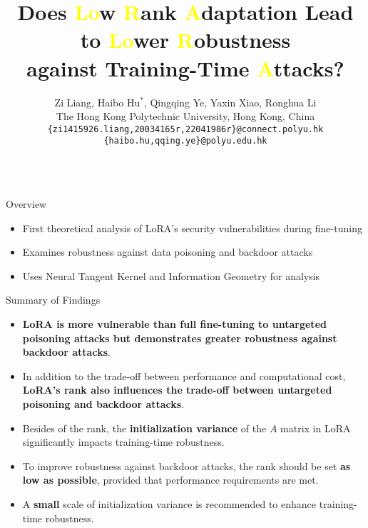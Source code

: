 \documentclass[final,hyperref={pdfpagelabels=false}]{beamer}
\title{Does \textcolor{yellow}{Lo}w \textcolor{yellow}{R}ank \textcolor{yellow}{A}daptation Lead to \textcolor{yellow}{Lo}wer \textcolor{yellow}{R}obustness\\
  against Training-Time \textcolor{yellow}{A}ttacks?}
\author{
  Zi Liang, Haibo Hu$^{*}$, Qingqing Ye,
  Yaxin Xiao, Ronghua Li
\\
  The Hong Kong Polytechnic University, Hong Kong, China\\
  \texttt{\{zi1415926.liang,20034165r,22041986r\}@connect.polyu.hk}\\
  \texttt{\{haibo.hu,qqing.ye\}@polyu.edu.hk}\\
}
\newcommand{\shrink}{-15pt}
\begin{document}

\begin{frame}[t] %

\begin{columns}[t] %



  \begin{column}{.34\textwidth} %

    \begin{block}{Overview}
      \begin{itemize}
      \item First theoretical analysis of LoRA's security vulnerabilities during fine-tuning
      \item Examines robustness against data poisoning and backdoor attacks
      \item Uses Neural Tangent Kernel and Information Geometry for analysis
      \end{itemize}
    \end{block}

    \begin{block}{Summary of Findings}
      \begin{itemize}
\item \textbf{LoRA is more vulnerable than full fine-tuning to untargeted
  poisoning attacks but demonstrates greater robustness against
  backdoor attacks}.
\item In addition to the trade-off between performance and
  computational cost, \textbf{LoRA’s rank also influences the trade-off
  between untargeted poisoning and backdoor attacks}.
\item Besides of the rank, the \textbf{initialization variance} of the $A$ matrix in LoRA
  significantly impacts training-time robustness.
\item To improve robustness against backdoor attacks, the rank should
  be set \textbf{as low as possible}, provided that performance requirements
  are met.
\item A \textbf{small} scale of initialization variance is recommended to
  enhance training-time robustness.
      \end{itemize}
    \end{block}


\end{column}
\end{columns}
\end{frame}
\end{document}
